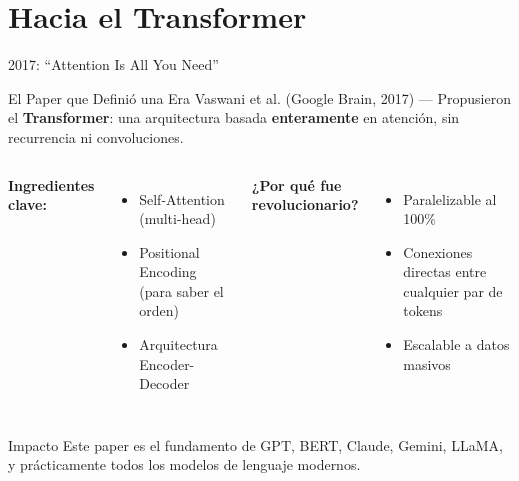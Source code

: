 \documentclass[aspectratio=169]{beamer}
\begin{document}
\section{Hacia el Transformer}

\begin{frame}{2017: ``Attention Is All You Need''}
    \begin{block}{El Paper que Definió una Era}
        Vaswani et al. (Google Brain, 2017) --- Propusieron el \textbf{Transformer}: una arquitectura basada \textbf{enteramente} en atención, sin recurrencia ni convoluciones.
    \end{block}
    
    \vspace{0.3cm}
    \begin{columns}
        \textbf{Ingredientes clave:}
        \begin{itemize}
            \item Self-Attention (multi-head)
            \item Positional Encoding (para saber el orden)
            \item Arquitectura Encoder-Decoder
        \end{itemize}
        
        \textbf{¿Por qué fue revolucionario?}
        \begin{itemize}
            \item[\faCheck] Paralelizable al 100\% 
            \item[\faCheck] Conexiones directas entre cualquier par de tokens
            \item[\faCheck] Escalable a datos masivos
        \end{itemize}
    \end{columns}
    
    \vspace{0.3cm}
    \begin{exampleblock}{Impacto}
        Este paper es el fundamento de GPT, BERT, Claude, Gemini, LLaMA, y prácticamente todos los modelos de lenguaje modernos.
    \end{exampleblock}
\end{frame}
\end{document}
